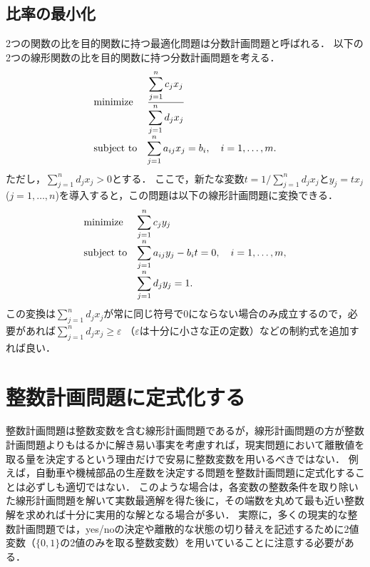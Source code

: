 \documentclass[japanese]{jnlp_1.4}
\begin{document}
\subsection{比率の最小化}
\label{sec:ratio}

2つの関数の比を目的関数に持つ最適化問題は分数計画問題と呼ばれる．
以下の2つの線形関数の比を目的関数に持つ分数計画問題を考える．
\begin{equation}
\begin{array}{ll}
\textnormal{minimize} & \displaystyle\frac{\displaystyle\sum_{j=1}^n c_j x_j}{\displaystyle\sum_{j=1}^n d_j x_j}\\
\textnormal{subject to} & \displaystyle\sum_{j=1}^n a_{ij} x_j = b_i, \quad i=1,\dots,m.\\
\end{array}
\end{equation}
ただし，$\sum_{j=1}^n d_j x_j > 0$とする．
ここで，新たな変数$t = 1 / \sum_{j=1}^n d_j x_j$と$y_j = t x_j$ ($j=1,\dots,n$)を導入すると，この問題は以下の線形計画問題に変換できる．
\begin{equation}
\begin{array}{ll}
\textnormal{minimize} & \displaystyle\sum_{j=1}^n c_j y_j\\
\textnormal{subject to} & \displaystyle\sum_{j=1}^n a_{ij} y_j - b_i t = 0, \quad i=1,\dots,m,\\
 & \displaystyle\sum_{j=1}^n d_j y_j = 1.
\end{array}
\end{equation}
この変換は$\sum_{j=1}^n d_j x_j$が常に同じ符号で0にならない場合のみ成立するので，必要があれば$\sum_{j=1}^n d_j x_j \ge \varepsilon$ （$\varepsilon$は十分に小さな正の定数）などの制約式を追加すれば良い．


\section{整数計画問題に定式化する}
\label{sec:mip-model}

整数計画問題は整数変数を含む線形計画問題であるが，線形計画問題の方が整数計画問題よりもはるかに解き易い事実を考慮すれば，現実問題において離散値を取る量を決定するという理由だけで安易に整数変数を用いるべきではない．
例えば，自動車や機械部品の生産数を決定する問題を整数計画問題に定式化することは必ずしも適切ではない．
このような場合は，各変数の整数条件を取り除いた線形計画問題を解いて実数最適解を得た後に，その端数を丸めて最も近い整数解を求めれば十分に実用的な解となる場合が多い．
実際に，多くの現実的な整数計画問題では，yes/noの決定や離散的な状態の切り替えを記述するために2値変数（$\{0,1\}$の2値のみを取る整数変数）を用いていることに注意する必要がある．
\end{document}
